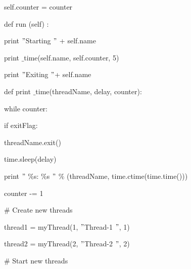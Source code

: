 \documentclass{wileySix}
\begin{document}
\begin{myEnumerate}


\newpage

{\fontsize{9pt}{9pt}\selectfont self.counter = counter} \par
\noindent 
{\fontsize{9pt}{9pt}\selectfont def run (self) :} \par
\noindent 
{\fontsize{9pt}{9pt}\selectfont  \hspace*{0.5in} print  $ " $Starting  $ " $ + self.name} \par
\noindent 
{\fontsize{9pt}{9pt}\selectfont  \hspace*{0.5in} print $  \_  $time(self.name, self.counter, 5)} \par
\noindent 
{\fontsize{9pt}{9pt}\selectfont  \hspace*{0.5in} print  $ " $Exiting  $ " $+ self.name} \par
\vspace{9pt}
\noindent 
{\fontsize{9pt}{9pt}\selectfont def print $  \_  $time(threadName, delay, counter):} \par
\noindent 
{\fontsize{9pt}{9pt}\selectfont while counter:} \par
\noindent 
{\fontsize{9pt}{9pt}\selectfont  \hspace*{0.5in} if exitFlag:} \par
\noindent 
{\fontsize{9pt}{9pt}\selectfont  \hspace*{0.5in}  \hspace*{0.5in} threadName.exit()} \par
\noindent 
{\fontsize{9pt}{9pt}\selectfont  \hspace*{0.5in} time.sleep(delay)} \par
\noindent 
{\fontsize{9pt}{9pt}\selectfont  \hspace*{0.5in} print  $ " $ $  \%  $s:  $  \%  $s $ " $  $  \%  $ (threadName, time.ctime(time.time()))} \par
\noindent 
{\fontsize{9pt}{9pt}\selectfont counter -= 1} \par
\vspace{9pt}
\noindent 
{\fontsize{9pt}{9pt}\selectfont  $  \#  $ Create new threads} \par
\noindent 
{\fontsize{9pt}{9pt}\selectfont thread1 = myThread(1,  $ " $Thread-1 $ " $, 1)} \par
\noindent 
{\fontsize{9pt}{9pt}\selectfont thread2 = myThread(2,  $ " $Thread-2 $ " $, 2)} \par
\vspace{9pt}
\noindent 
{\fontsize{9pt}{9pt}\selectfont  $  \#  $ Start new threads} \par

\end{myEnumerate}
\end{document}
